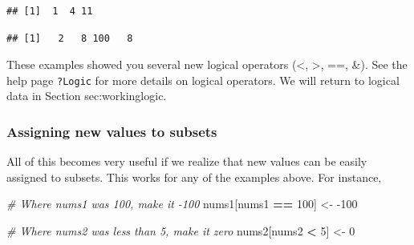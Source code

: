 \documentclass[]{book}
\newenvironment{Shaded}{\begin{snugshade}}{\end{snugshade}}
\newcommand{\CommentTok}[1]{\textcolor[rgb]{0.56,0.35,0.01}{\textit{#1}}}
\newcommand{\DecValTok}[1]{\textcolor[rgb]{0.00,0.00,0.81}{#1}}
\newcommand{\KeywordTok}[1]{\textcolor[rgb]{0.13,0.29,0.53}{\textbf{#1}}}
\newcommand{\NormalTok}[1]{#1}
\newcommand{\OperatorTok}[1]{\textcolor[rgb]{0.81,0.36,0.00}{\textbf{#1}}}
\newcommand{\StringTok}[1]{\textcolor[rgb]{0.31,0.60,0.02}{#1}}
\begin{document}
\begin{Shaded}
\end{Shaded}

\begin{verbatim}
## [1]  1  4 11
\end{verbatim}

\begin{Shaded}
\end{Shaded}

\begin{verbatim}
## [1]   2   8 100   8
\end{verbatim}

These examples showed you several new logical operators (\textless, \textgreater, ==, \&). See the help page \texttt{?Logic} for more details on logical operators. We will return to logical data in Section sec:workinglogic.

\hypertarget{assigning-new-values-to-subsets}{%
\subsubsection{Assigning new values to subsets}\label{assigning-new-values-to-subsets}}

All of this becomes very useful if we realize that new values can be easily assigned to subsets. This works for any of the examples above. For instance,

\begin{Shaded}
\begin{Highlighting}[]
\CommentTok{# Where nums1 was 100, make it -100}
\NormalTok{nums1[nums1 }\OperatorTok{==}\StringTok{ }\DecValTok{100}\NormalTok{] <-}\StringTok{ }\DecValTok{-100}

\CommentTok{# Where nums2 was less than 5, make it zero}
\NormalTok{nums2[nums2 }\OperatorTok{<}\StringTok{ }\DecValTok{5}\NormalTok{] <-}\StringTok{ }\DecValTok{0}
\end{Highlighting}
\end{Shaded}
\end{document}
